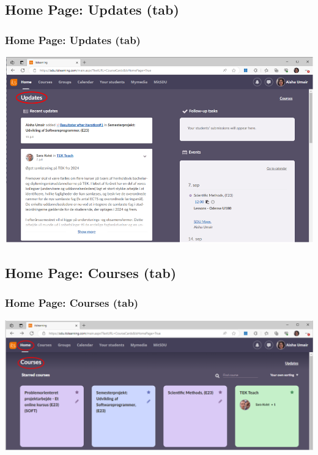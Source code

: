\documentclass[t, aspectratio=169]{beamer}
\begin{document}
\subsection{Home Page: Updates (tab)}
\begin{frame}[fragile]
  \frametitle{Home Page: Updates (tab)}
  \vspace{2.2mm}
  \begin{center}
    \includegraphics[width=14cm]{figs/itslearning/updates.png}
  \end{center}
\end{frame}

\subsection{Home Page: Courses (tab)}
\begin{frame}[fragile]
  \frametitle{Home Page: Courses (tab)}
  \vspace{9mm}
  \begin{center}
    \includegraphics[width=14cm]{figs/itslearning/courses.png}
  \end{center}
\end{frame}
\end{document}

